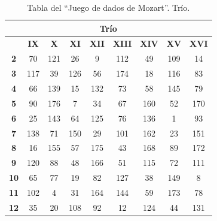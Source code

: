 \documentclass[a4paper, openright, 11pt, titlepage]{report}
\theoremstyle{definition}\newtheorem{defin}[propo]{Definition}
\theoremstyle{definition}\newtheorem{obser}[propo]{Remark}
\theoremstyle{definition}\newtheorem{ejem}[propo]{Ejemplo}
\theoremstyle{definition}\newtheorem{algoritmo}[propo]{Algoritmo}
\begin{document}
\begin{table}[H]
    \centering
    \begin{tabular}{|c|c|c|c|c|c|c|c|c|}
    \hline
    \multicolumn{9}{|c|}{Trío}\\
    \hline \hline 
         & \textbf{IX} & \textbf{X} & \textbf{XI} & \textbf{XII} & \textbf{XIII} & \textbf{XIV} & \textbf{XV} & \textbf{XVI}\\
         \hline
         \textbf{2} & 70 & 121 & 26 & 9 & 112 & 49 & 109 & 14\\
         \hline
         \textbf{3} & 117 & 39 & 126 & 56 & 174 & 18 & 116 & 83\\
         \hline
         \textbf{4} & 66 & 139 & 15 & 132 & 73 & 58 & 145 & 79\\
         \hline
         \textbf{5} & 90 & 176 & 7 & 34 & 67 & 160 & 52 & 170\\
         \hline
         \textbf{6} & 25 & 143 & 64 & 125 & 76 & 136 & 1 & 93\\
         \hline
         \textbf{7} & 138 & 71 & 150 & 29 & 101 & 162 & 23 & 151\\
         \hline
         \textbf{8} & 16 & 155 & 57 & 175 & 43 & 168 & 89 & 172\\
         \hline
         \textbf{9} & 120 & 88 & 48 & 166 & 51 & 115 & 72 & 111\\
         \hline
         \textbf{10} & 65 & 77 & 19 & 82 & 127 & 38 & 149 & 8\\
         \hline
         \textbf{11} & 102 & 4 & 31 & 164 & 144 & 59 & 173 & 78\\
         \hline
         \textbf{12} & 35 & 20 & 108 & 92 & 12 & 124 & 44 & 131\\
         \hline
    \end{tabular}
    \caption{Tabla del ``Juego de dados de Mozart''. Trío.}
\end{table}
\end{document}
